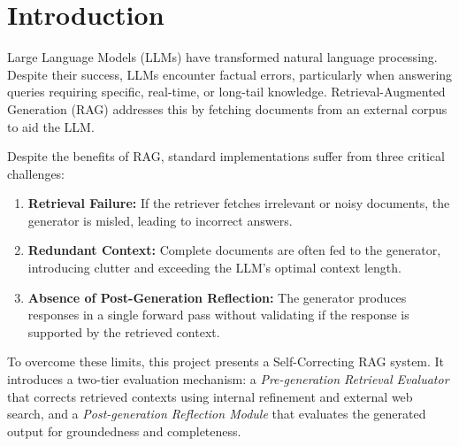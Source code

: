 \documentclass[12pt,a4paper]{article}
\begin{document}
\newpage

\section{Introduction}
Large Language Models (LLMs) have transformed natural language processing. Despite their success, LLMs encounter factual errors, particularly when answering queries requiring specific, real-time, or long-tail knowledge. Retrieval-Augmented Generation (RAG) addresses this by fetching documents from an external corpus to aid the LLM. 

Despite the benefits of RAG, standard implementations suffer from three critical challenges:
\begin{enumerate}
    \item \textbf{Retrieval Failure:} If the retriever fetches irrelevant or noisy documents, the generator is misled, leading to incorrect answers.
    \item \textbf{Redundant Context:} Complete documents are often fed to the generator, introducing clutter and exceeding the LLM's optimal context length.
    \item \textbf{Absence of Post-Generation Reflection:} The generator produces responses in a single forward pass without validating if the response is supported by the retrieved context.
\end{enumerate}

To overcome these limits, this project presents a Self-Correcting RAG system. It introduces a two-tier evaluation mechanism: a \textit{Pre-generation Retrieval Evaluator} that corrects retrieved contexts using internal refinement and external web search, and a \textit{Post-generation Reflection Module} that evaluates the generated output for groundedness and completeness.
\end{document}
